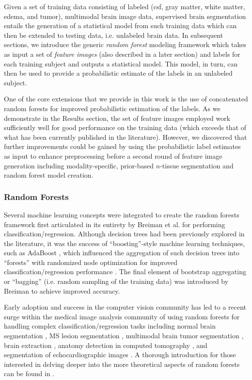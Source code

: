 \documentclass[final,5p,times,twocolumn]{elsarticle}
\begin{document}
Given a set of training data consisting of 
labeled (csf, gray matter, white matter, edema, and tumor),
multimodal brain image data, 
supervised brain segmentation entails the generation of a 
statistical model from such training data which can
then be extended to testing data, i.e. unlabeled 
brain data.  In subsequent sections, we introduce the generic
{\it random forest} modeling framework which takes as input
a set of {\it feature images} (also described in a later section)
and labels for each training subject 
and outputs a statistical model.  This model, in turn, can then
be used to provide a probabilistic estimate of the labels in an
unlabeled subject. 

One of the core extensions that we provide in this work is
the use of concatenated random forests for improved probabilistic estimation
of the labels.
As we demonstrate in the Results section, the set of feature
images employed work sufficiently well for good performance
on the training data (which exceeds that of what has been
currently published in the literature).  However, we discovered
that further improvements could be gained by using the probabilistic 
label estimates as input to enhance preprocessing before a 
second round of feature image generation including 
modality-specific, prior-based $n$-tissue segmentation and 
random forest model creation. 

\subsubsection{Random Forests}

Several machine learning concepts were integrated to create 
the random forests framework first articulated in its entirety by Breiman
et al. \cite{breiman2001} for performing classification/regression.  
Although decision trees had been previously explored in the literature, 
it was the success of ``boosting''-style machine learning 
techniques, such as AdaBoost \cite{schapire1990,freund1997}, which influenced 
the aggregation of such decision trees into ``forests'' 
with randomized node optimization for improved
classification/regression performance \cite{ho1995,amit1997}.
The final element of bootstrap aggregating or ``bagging'' (i.e.
random sampling of the training data) was
introduced by Breiman \cite{breiman1996} to achieve improved
accuracy.  

Early adoption \cite{viola2005} and success in the
computer vision community
has led to a recent surge within the medical image analysis
community of using random forests for handling complex 
classification/regression tasks including
normal brain segmentation \cite{yi2009},
MS lesion segmentation \cite{geremia2011}, 
multimodal brain tumor segmentation
\cite{zikic2012,geremia2012}, brain extraction \cite{iglesias2010}, 
anatomy detection in computed tomography \cite{criminisi2013}, and
segmentation of echocardiographic images \cite{verhoek2011}.
A thorough introduction for those interested in delving deeper 
into the more theoretical aspects of random forests can be found
in \cite{criminisi2011}.
\end{document}
